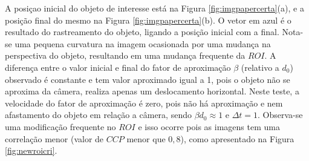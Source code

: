 A posiçao inicial do objeto de interesse está na Figura \ref{fig:imgpapercerta}(a), 
e a  posição final do mesmo na Figura \ref{fig:imgpapercerta}(b). 
O vetor em azul é o resultado do rastreamento do objeto, ligando a posição inicial com a final.
Nota-se uma pequena curvatura na imagem ocasionada por uma mudança
na perspectiva do objeto, resultando em uma mudança frequente da $ROI$.
A diferença entre o valor inicial e final do fator de aproximação $\beta$ (relativo a $d_0$) observado é  constante
e tem valor aproximado  igual a 1, pois o objeto não se aproxima da câmera, realiza apenas um deslocamento horizontal.
Neste teste, a velocidade do fator de aproximação é zero, pois não há aproximação e nem
afastamento do objeto em relação a câmera, sendo $\beta d_0 \approx 1$ e $\Delta t=1$.
Observa-se uma modificação frequente no $ROI$ e isso ocorre pois as imagens 
tem uma correlação menor (valor de $CCP$ menor que $0,8$), como apresentado na Figura \ref{fig:newroicri}.
